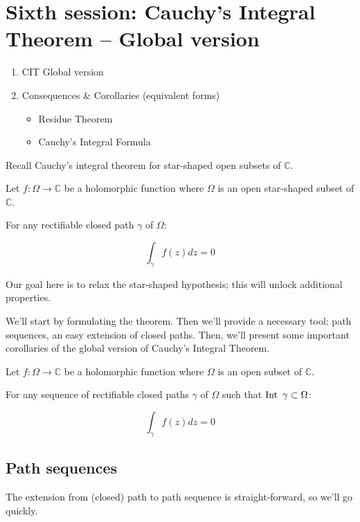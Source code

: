 \section{Sixth session: Cauchy's Integral Theorem  -- Global version}

\begin{enumerate}
    \item CIT Global version
    \item Consequences \& Corollaries (equivalent forms)
        \begin{itemize}
            \item Residue Theorem
            \item Cauchy's Integral Formula
            \end{itemize}
\end{enumerate}

Recall Cauchy's integral theorem for star-shaped open subsets of $\mathbb{C}$.

\begin{thm*}
    Let $f: \Omega \rightarrow \mathbb{C}$ be a holomorphic function where $\Omega$ is an open star-shaped subset of $\mathbb{C}$.

    For any rectifiable closed path $\gamma$ of $\Omega$:

    $$ \int_\gamma f(z)dz = 0 $$
\end{thm*}

Our goal here is to relax the star-shaped hypothesis; this will unlock additional properties.

We'll start by formulating the theorem. Then we'll provide a necessary tool: path sequences, an easy extension of closed paths. Then, we'll present some important corollaries of the global version of Cauchy's Integral Theorem.


\begin{thm*}
    Let $f: \Omega \rightarrow \mathbb{C}$ be a holomorphic function where $\Omega$ is an open subset of $\mathbb{C}$.

    For any sequence of rectifiable closed paths $\gamma$ of $\Omega$ such that $\operatorname{Int}~\gamma \subset \Omega$:

    $$ \int_\gamma f(z)dz = 0 $$
\end{thm*}

\subsection*{Path sequences}
The extension from (closed) path to path sequence is straight-forward, so we'll go quickly. 

